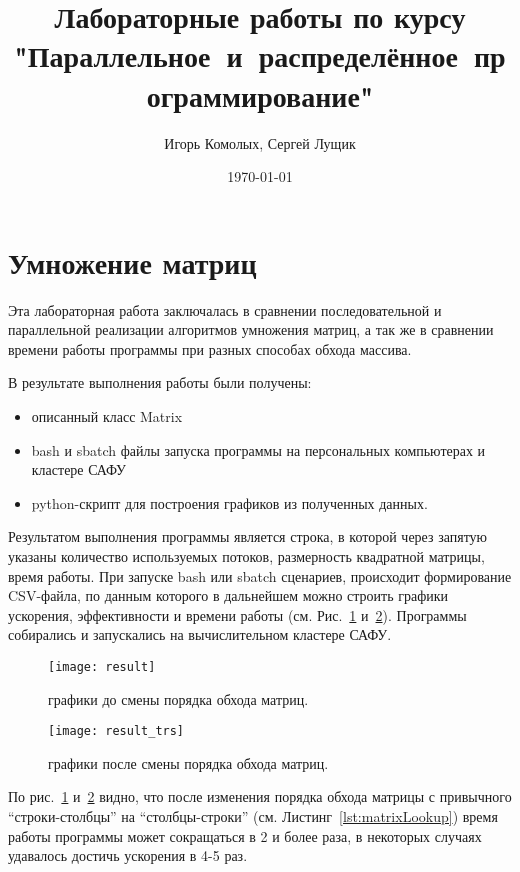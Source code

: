 \documentclass{article}
\author{Игорь Комолых, Сергей Лущик}
\title{Лабораторные работы по курсу "Параллельное~и~распределённое~программирование"}
\date{\today}
\begin{document}
	\begin{titlepage}
		\maketitle
	\end{titlepage}
	
	\section{Умножение матриц}\label{sec:lab1}

	Эта лабораторная работа заключалась в сравнении последовательной и параллельной реализации алгоритмов умножения матриц,
	а так же в сравнении времени работы программы при разных способах обхода массива.

	В результате выполнения работы были получены:
	\begin{itemize}
		\item описанный класс Matrix
		\item bash и sbatch файлы запуска программы на персональных компьютерах и кластере САФУ
		\item python-скрипт для построения графиков из полученных данных.
 	\end{itemize}

	Результатом выполнения программы является строка, в которой через запятую указаны количество используемых потоков, размерность квадратной матрицы, время работы. При запуске bash или sbatch сценариев, происходит формирование CSV-файла, по данным которого в дальнейшем можно строить графики ускорения, эффективности и времени работы (см. Рис.~\ref{fig:beforeChange} и~\ref{fig:afterChange}). Программы собирались и запускались на вычислительном кластере САФУ.

	\begin{figure}[h]
		\centering
		\texttt{[image: result]}
		\caption{графики до смены порядка обхода матриц.}
		\label{fig:beforeChange} 
	\end{figure}

	\begin{figure}[h]
		\centering
		\texttt{[image: result\_trs]}
		\caption{графики после смены порядка обхода матриц.}
		\label{fig:afterChange} 
	\end{figure}

	По рис.~\ref{fig:beforeChange} и~\ref{fig:afterChange} видно, что после изменения порядка обхода матрицы с привычного ``строки-столбцы'' на ``столбцы-строки'' (см. Листинг~\ref{lst:matrixLookup}) время работы программы может сокращаться в 2 и более раза, в некоторых случаях удавалось достичь ускорения в 4-5 раз.
\end{document}
